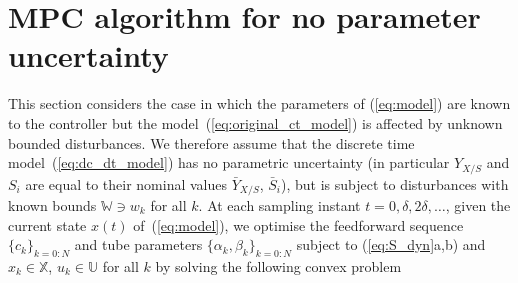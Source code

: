 \documentclass[final,5p,times,twocolumn,authoryear]{elsarticle}
\def\X{\mathbb{X}}
\def\U{\mathbb{U}}
\def\W{\mathbb{W}}
\begin{document}
\section{MPC algorithm for no parameter uncertainty}\label{sec:nominal_mpc}

This section considers the case in which the parameters of (\ref{eq:model}) are known to the controller but the model~(\ref{eq:original_ct_model}) is affected by unknown bounded disturbances. We therefore assume that the discrete time model~(\ref{eq:dc_dt_model}) has no parametric uncertainty (in particular $Y_{X/S}$ and $S_i$ are equal to their nominal values $\bar{Y}_{X/S}$, $\bar{S}_i$), but is subject to disturbances with known bounds $\W\ni w_k$ for all $k$.
%
At each sampling instant $t =0,\delta, 2\delta,\ldots$, given the current state $x(t)$ of~(\ref{eq:model}), we optimise the feedforward sequence $\{c_k\}_{k=0:N}$ and tube parameters $\{\alpha_k,\beta_k\}_{k=0:N}$ subject to (\ref{eq:S_dyn}a,b) and
$x_k\in \X$, $u_k \in \U$ for all $k$
by solving the following convex problem
\end{document}

